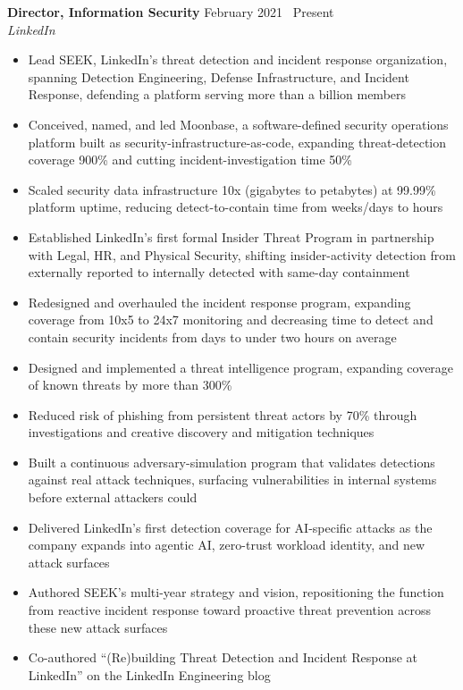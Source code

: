 \documentclass[10.5pt]{article}
\newcommand{\role}[3]{%
  \noindent\textbf{#1} \hfill {\small\color{darkgray} #3}\\
  {\itshape\small #2}\par\smallskip
}
\begin{document}
\role{Director, Information Security}{LinkedIn}{February 2021 \textendash\ Present}
\begin{itemize}
  \item Lead SEEK, LinkedIn's threat detection and incident response organization, spanning Detection Engineering, Defense Infrastructure, and Incident Response, defending a platform serving more than a billion members
  \item Conceived, named, and led Moonbase, a software-defined security operations platform built as security-infrastructure-as-code, expanding threat-detection coverage 900\% and cutting incident-investigation time 50\%
  \item Scaled security data infrastructure 10x (gigabytes to petabytes) at 99.99\% platform uptime, reducing detect-to-contain time from weeks/days to hours
  \item Established LinkedIn's first formal Insider Threat Program in partnership with Legal, HR, and Physical Security, shifting insider-activity detection from externally reported to internally detected with same-day containment
  \item Redesigned and overhauled the incident response program, expanding coverage from 10x5 to 24x7 monitoring and decreasing time to detect and contain security incidents from days to under two hours on average
  \item Designed and implemented a threat intelligence program, expanding coverage of known threats by more than 300\%
  \item Reduced risk of phishing from persistent threat actors by 70\% through investigations and creative discovery and mitigation techniques
  \item Built a continuous adversary-simulation program that validates detections against real attack techniques, surfacing vulnerabilities in internal systems before external attackers could
  \item Delivered LinkedIn's first detection coverage for AI-specific attacks as the company expands into agentic AI, zero-trust workload identity, and new attack surfaces
  \item Authored SEEK's multi-year strategy and vision, repositioning the function from reactive incident response toward proactive threat prevention across these new attack surfaces
  \item Co-authored \textquotedblleft{}(Re)building Threat Detection and Incident Response at LinkedIn\textquotedblright{} on the LinkedIn Engineering blog
\end{itemize}
\end{document}
